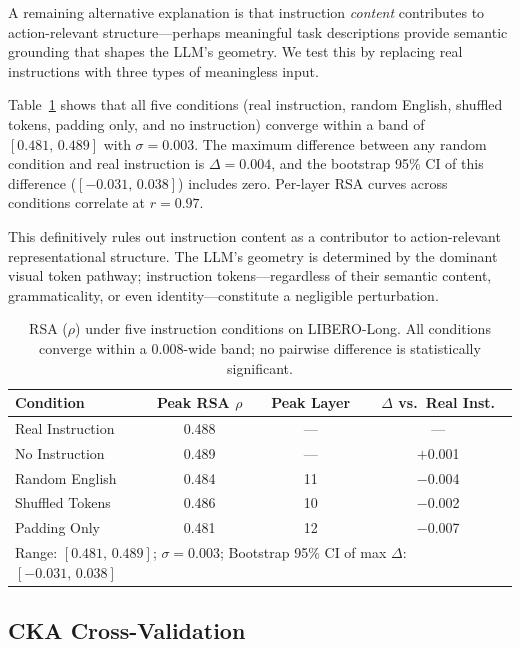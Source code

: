 \documentclass[10pt,letterpaper]{article}
\begin{document}
A remaining alternative explanation is that instruction \emph{content} contributes to action-relevant structure---perhaps meaningful task descriptions provide semantic grounding that shapes the LLM's geometry.
We test this by replacing real instructions with three types of meaningless input.

Table~\ref{tab:random_inst} shows that all five conditions (real instruction, random English, shuffled tokens, padding only, and no instruction) converge within a band of $[0.481,\, 0.489]$ with $\sigma{=}0.003$.
The maximum difference between any random condition and real instruction is $\Delta{=}0.004$, and the bootstrap 95\% CI of this difference ($[-0.031,\, 0.038]$) includes zero.
Per-layer RSA curves across conditions correlate at $r{=}0.97$.

This definitively rules out instruction content as a contributor to action-relevant representational structure.
The LLM's geometry is determined by the dominant visual token pathway; instruction tokens---regardless of their semantic content, grammaticality, or even identity---constitute a negligible perturbation.

\begin{table}[t]
\centering
\caption{RSA ($\rho$) under five instruction conditions on LIBERO-Long. All conditions converge within a 0.008-wide band; no pairwise difference is statistically significant.}
\label{tab:random_inst}
\begin{tabular}{lccc}
\toprule
\textbf{Condition} & \textbf{Peak RSA $\rho$} & \textbf{Peak Layer} & \textbf{$\Delta$ vs.\ Real Inst.} \\
\midrule
Real Instruction    & 0.488 & --- & --- \\
No Instruction      & 0.489 & --- & $+$0.001 \\
Random English      & 0.484 & 11  & $-$0.004 \\
Shuffled Tokens     & 0.486 & 10  & $-$0.002 \\
Padding Only        & 0.481 & 12  & $-$0.007 \\
\midrule
\multicolumn{4}{l}{\small Range: $[0.481,\, 0.489]$; $\sigma = 0.003$; Bootstrap 95\% CI of max $\Delta$: $[-0.031,\, 0.038]$} \\
\bottomrule
\end{tabular}
\end{table}


\subsection{CKA Cross-Validation}
\label{sec:exp_cka}
\end{document}
